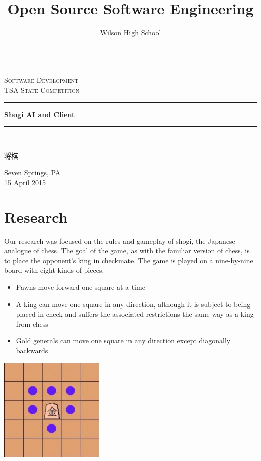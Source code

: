 \documentclass[letterpaper,12pt]{article}
\title{Open Source Software Engineering}
\author{Wilson High School}
\begin{document}
\begin{titlepage}
\begin{center}
 ~\\[1cm]
 \textsc{\LARGE Software Development}\\[1.5cm]
 \textsc{\Large TSA State Competition}\\[0.5cm]
 \rule{\linewidth}{0.5mm}
 {\huge \bfseries Shogi AI and Client \\[0.4cm]}
 \rule{\linewidth}{0.5mm}\\[0.5cm]
 \begin{CJK}{UTF8}{gbsn}
 {\huge 将棋}
 \end{CJK}
 \vfill
 {\large Seven Springs, PA \\[0.4cm]}
 {\large 15 April 2015}
\end{center}
\end{titlepage}

\tableofcontents

\pagebreak

\section{Research}

Our research was focused on the rules and gameplay of shogi, the Japanese analogue of chess. The goal of the game, as with the familiar version of chess, is to place the opponent's king in checkmate. The game is played on a nine-by-nine board with eight kinds of pieces:

\begin{itemize}
 \item Pawns move forward one square at a time
 \item A king can move one square in any direction, although it is subject to being placed in check and suffers the associated restrictions the same way as a king from chess 
 \item Gold generals can move one square in any direction except diagonally backwards
 \end{itemize}

 \begin{center}
  \includegraphics[width=5cm]{img/goldMove.jpg}
 \end{center}
 
\end{document}
